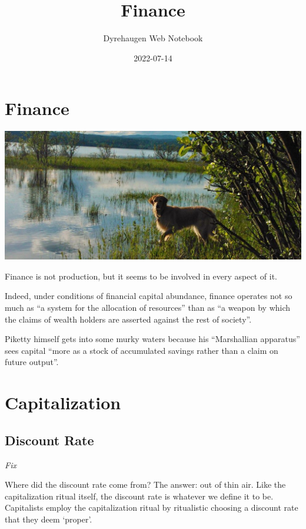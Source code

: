 \documentclass[
]{book}
\title{Finance}
\author{Dyrehaugen Web Notebook}
\date{2022-07-14}
\begin{document}
\maketitle

{
\setcounter{tocdepth}{1}
\tableofcontents
}
\hypertarget{finance}{%
\chapter{Finance}\label{finance}}

\includegraphics{fig/zelda.jpg}

Finance is not production, but it seems to be involved in every aspect of it.

Indeed, under conditions of financial capital abundance,
finance operates not so much as ``a system for the allocation of resources''
than as ``a weapon by which the claims of wealth holders are
asserted against the rest of society''.

Piketty himself gets into some murky waters because his
``Marshallian apparatus'' sees capital ``more as a stock of accumulated savings rather
than a claim on future output''.

\hypertarget{capitalization}{%
\chapter{Capitalization}\label{capitalization}}

\hypertarget{discount-rate}{%
\section{Discount Rate}\label{discount-rate}}

\emph{Fix}

Where did the discount rate come from? The answer: out of thin air. Like the capitalization ritual itself, the discount rate is whatever we define it to be. Capitalists employ the capitalization ritual by ritualistic choosing a discount rate that they deem `proper'.
\end{document}
